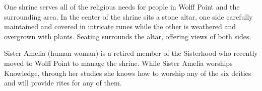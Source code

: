 One shrine serves all of the religious needs for people in Wolff Point and the surrounding area.
In the center of the shrine sits a stone altar, one side carefully maintained and covered in intricate runes while the other is weathered and overgrown with plants.
Seating surrounds the altar, offering views of both sides.

Sister Amelia (human woman) is a retired member of the Sisterhood who recently moved to Wolff Point to manage the shrine.
While Sister Amelia worships Knowledge, through her studies she knows how to worship any of the six deities and will provide rites for any of them.

